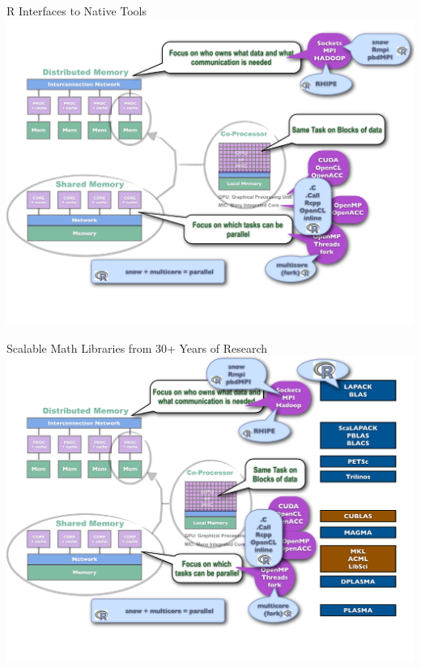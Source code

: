 \begin{frame}
\begin{block}{\scriptsize R Interfaces to Native Tools}
    \includegraphics[width=\textwidth,trim=0ex 20ex 0ex 0ex,clip]{../common/pics/hardware/ParallelHardware10.pdf}
  \end{block}
\end{frame}

\begin{frame}
  \begin{block}{\scriptsize Scalable Math Libraries from 30+ Years of Research}
    \includegraphics[width=\textwidth,trim=0ex 20ex 0ex 0ex,clip]{../common/pics/hardware/ParallelHardware11.pdf}
  \end{block}
\end{frame}

